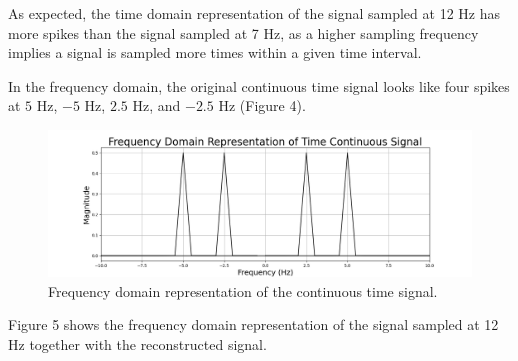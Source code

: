 \documentclass{article}
\begin{document}

    
    

As expected, the time domain representation of the signal sampled at 12 Hz has more spikes than the signal sampled at 7 Hz, as a higher sampling frequency implies a signal is sampled more times within a given time interval.

In the frequency domain, the original continuous time signal looks like four spikes at $5$ Hz, $-5$ Hz, $2.5$ Hz, and $-2.5$ Hz (Figure 4).
\begin{figure}[H]
    \includegraphics[width=\linewidth]{images/freqdom_timecont_black.png}
    \caption{Frequency domain representation of the continuous time signal.}
    \label{fig:enter-label}
\end{figure}

Figure 5 shows the frequency domain representation of the signal sampled at 12 Hz together with the reconstructed signal. 
\end{document}
